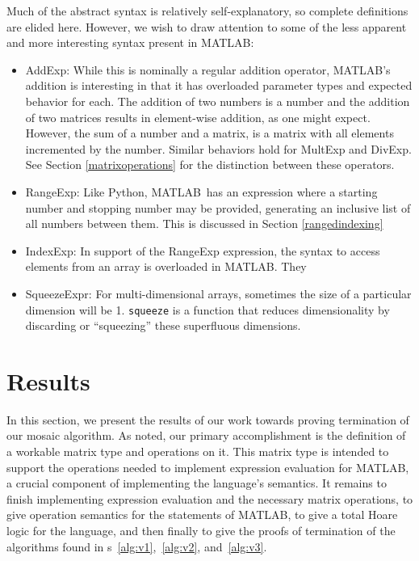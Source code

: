 \documentclass[11pt,conference]{IEEEtran}
\newcommand{\matlab}{MATLAB}
\newcommand{\mmatlab}{\textmu\matlab}
\theoremstyle{plain} %
\theoremstyle{definition}
\theoremstyle{remark}
\begin{document}
Much of the abstract syntax is relatively self-explanatory, so complete
definitions are elided here. However, we wish to draw attention to some of the
less apparent and more interesting syntax present in \mmatlab\@:

\begin{itemize}

    \item \textsf{AddExp}: While this is nominally a regular addition operator,
        \matlab's addition is interesting in that it has overloaded parameter
        types and expected behavior for each. The addition of two numbers is a
        number and the addition of two matrices results in element-wise
        addition, as one might expect. However, the sum of a number and a
        matrix, is a matrix with all elements incremented by the number. Similar
        behaviors hold for \textsf{MultExp} and \textsf{DivExp}. See Section \ref{matrixoperations} for the distinction between these operators.
        
    \item \textsf{RangeExp}: Like Python, \matlab\ has an expression where a
        starting number and stopping number may be provided, generating an
        inclusive list of all numbers between them. This is discussed in Section \ref{rangedindexing}
        
    \item \textsf{IndexExp}: In support of the RangeExp expression, the syntax to access elements from an array is overloaded in \matlab\@. They


    \item \textsf{SqueezeExpr}: For multi-dimensional arrays, sometimes the size
        of a particular dimension will be 1. \texttt{squeeze} is a function that
        reduces dimensionality by discarding or ``squeezing'' these superfluous
        dimensions.

\end{itemize}

\section{Results}\label{S:results}

In this section, we present the results of our work towards proving termination
of our mosaic algorithm. As noted, our primary accomplishment is the definition
of a workable matrix type and operations on it. This matrix type is intended to
support the operations needed to implement expression evaluation for \mmatlab, a
crucial component of implementing the language's semantics. It remains to finish
implementing expression evaluation and the necessary matrix operations, to give
operation semantics for the statements of \mmatlab, to give a total Hoare logic
for the language, and then finally to give the proofs of termination of the
algorithms found in \figurename{s}~\ref{alg:v1},~\ref{alg:v2}, and~\ref{alg:v3}.
\end{document}
